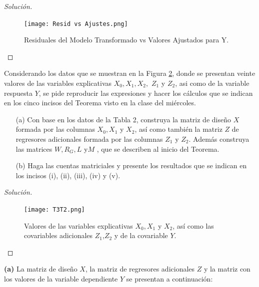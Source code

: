 \documentclass[10.5pt,notitlepage]{article}
\newenvironment{solucion}
  {\begin{proof}[Solución]}
  {\end{proof}}
\theoremstyle{plain}
\begin{document}
\begin{solucion}
\begin{figure}[htb]
 \centering
 \texttt{[image: Resid vs Ajustes.png]}
 \caption{Residuales del Modelo Transformado vs Valores Ajustados para Y.}
 \label{fig:18}
\end{figure}

\end{solucion}

\setcounter{exo}{1}
\begin{exo}
Considerando los datos que se muestran en la Figura \ref{fig:2}, donde se presentan veinte valores de 
las variables explicativas $X_0, X_1, X_2,$ $Z_1$ y $Z_2$, asi como de la variable respuesta $Y$, se pide reproducir las 
expresiones y hacer los cálculos que se indican en los cinco incisos del Teorema visto en la clase del 
miércoles. 


\begin{itemize}
\item[(a)] Con base en los datos de la Tabla 2, construya la matriz de diseño $X$ formada por las columnas $X_0, X_1$ y 
$X_2$, así como también la matriz $Z$ de regresores adicionales formada por las columnas $Z_1$ y $Z_2$. Además 
construya las matrices $W,R_G,L $ y$M$ , que se describen al inicio del Teorema. 
\item[(b)] Haga las cuentas matriciales y presente los resultados que se indican en los incisos (i), (ii), (iii), (iv) y 
(v). 
\end{itemize}
\end{exo}
\begin{solucion}
\begin{figure}[htb]
 \centering
 \texttt{[image: T3T2.png]}
 \caption{Valores de las variables explicativas \(X_0,X_1\) y \(X_2\), así como las covariables adicionales \(Z_1\),\(Z_2\) y de la covariable \(Y\).}
 \label{fig:2}
\end{figure}
\end{solucion}
\textbf{(a)} La matriz de diseño \(X\), la matriz de regresores adicionales \(Z\) y la matriz con los valores de la variable dependiente \(Y\) se presentan a continuación: 
\end{document}
